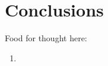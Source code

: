 
\chapter{Conclusions}

\label{Conclusion} %


Food for thought here:
\begin{enumerate}
    \item 
\end{enumerate}

